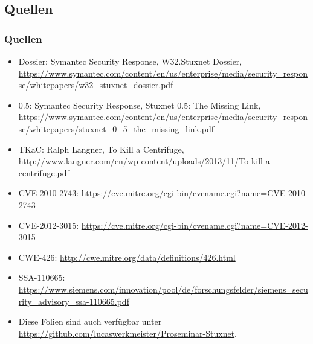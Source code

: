 \documentclass{beamer}
\begin{document}
\subsection{Quellen}

\begin{frame}
  \frametitle{Quellen}
  \fontsize{6pt}{7.2}\selectfont
  \begin{itemize}
    \item Dossier: Symantec Security Response, W32.Stuxnet Dossier, \url{https://www.symantec.com/content/en/us/enterprise/media/security_response/whitepapers/w32_stuxnet_dossier.pdf}
    \item 0.5: Symantec Security Response, Stuxnet 0.5: The Missing Link, \url{https://www.symantec.com/content/en/us/enterprise/media/security_response/whitepapers/stuxnet_0_5_the_missing_link.pdf}
    \item TKaC: Ralph Langner, To Kill a Centrifuge, \url{http://www.langner.com/en/wp-content/uploads/2013/11/To-kill-a-centrifuge.pdf}
    \item CVE-2010-2743: \url{https://cve.mitre.org/cgi-bin/cvename.cgi?name=CVE-2010-2743}
    \item CVE-2012-3015: \url{https://cve.mitre.org/cgi-bin/cvename.cgi?name=CVE-2012-3015}
    \item CWE-426: \url{http://cwe.mitre.org/data/definitions/426.html}
    \item SSA-110665: \url{https://www.siemens.com/innovation/pool/de/forschungsfelder/siemens_security_advisory_ssa-110665.pdf}
    \item Diese Folien sind auch verfügbar unter \url{https://github.com/lucaswerkmeister/Proseminar-Stuxnet}.
  \end{itemize}
\end{frame}
\end{document}
